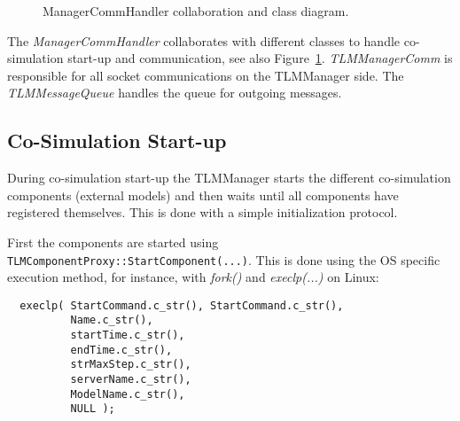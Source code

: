 \begin{figure}
\begin{center}
      \caption{ManagerCommHandler collaboration and class diagram.}
      \label{fig:ManagerCommHandlerClassDesign}
    \end{center}
\end{figure}

The {\em ManagerCommHandler} collaborates with different classes to handle co-simulation start-up and communication, see also Figure~\ref{fig:ManagerCommHandlerClassDesign}. 
{\em TLMManagerComm} is responsible for all socket communications on the TLMManager side. The {\em TLMMessageQueue} handles the queue for outgoing messages.

\subsection{Co-Simulation Start-up}
During co-simulation start-up the TLMManager starts the different co-simulation components (external models) and then waits until all components have registered themselves. 
This is done with a simple initialization protocol.

First the components are started using {\tt TLMComponentProxy::StartComponent(...)}. 
This is done using the OS specific execution method, for instance, with {\it fork()} and {\it execlp(...)} on Linux:
{\scriptsize
\begin{verbatim}
  execlp( StartCommand.c_str(), StartCommand.c_str(),
          Name.c_str(),
          startTime.c_str(),
          endTime.c_str(),
          strMaxStep.c_str(),
          serverName.c_str(),
          ModelName.c_str(),
          NULL );
\end{verbatim}
}

